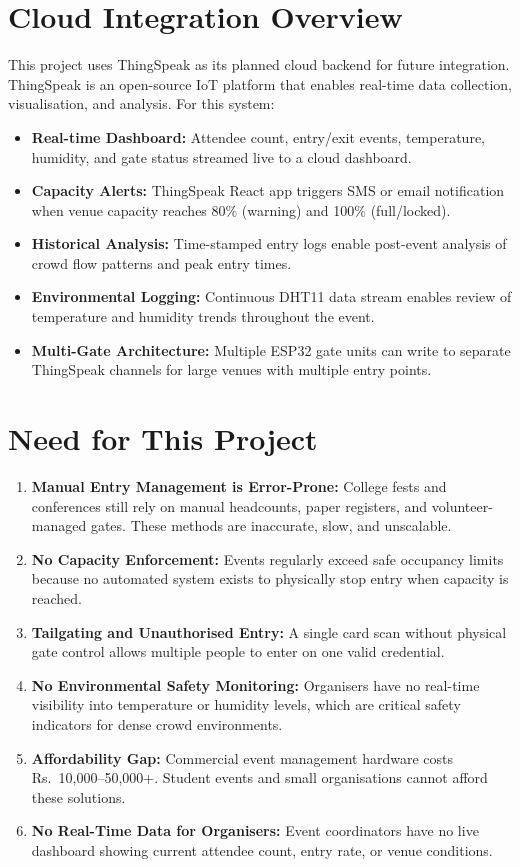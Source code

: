 \documentclass[12pt,a4paper]{report}
\begin{document}
\section{Cloud Integration Overview}

This project uses ThingSpeak as its planned cloud backend for future integration. ThingSpeak is an open-source IoT platform that enables real-time data collection, visualisation, and analysis. For this system:

\begin{itemize}[leftmargin=*]
    \item \textbf{Real-time Dashboard:} Attendee count, entry/exit events, temperature, humidity, and gate status streamed live to a cloud dashboard.
    \item \textbf{Capacity Alerts:} ThingSpeak React app triggers SMS or email notification when venue capacity reaches 80\% (warning) and 100\% (full/locked).
    \item \textbf{Historical Analysis:} Time-stamped entry logs enable post-event analysis of crowd flow patterns and peak entry times.
    \item \textbf{Environmental Logging:} Continuous DHT11 data stream enables review of temperature and humidity trends throughout the event.
    \item \textbf{Multi-Gate Architecture:} Multiple ESP32 gate units can write to separate ThingSpeak channels for large venues with multiple entry points.
\end{itemize}

\section{Need for This Project}

\begin{enumerate}[leftmargin=*]
    \item \textbf{Manual Entry Management is Error-Prone:} College fests and conferences still rely on manual headcounts, paper registers, and volunteer-managed gates. These methods are inaccurate, slow, and unscalable.
    \item \textbf{No Capacity Enforcement:} Events regularly exceed safe occupancy limits because no automated system exists to physically stop entry when capacity is reached.
    \item \textbf{Tailgating and Unauthorised Entry:} A single card scan without physical gate control allows multiple people to enter on one valid credential.
    \item \textbf{No Environmental Safety Monitoring:} Organisers have no real-time visibility into temperature or humidity levels, which are critical safety indicators for dense crowd environments.
    \item \textbf{Affordability Gap:} Commercial event management hardware costs Rs.~10,000--50,000+. Student events and small organisations cannot afford these solutions.
    \item \textbf{No Real-Time Data for Organisers:} Event coordinators have no live dashboard showing current attendee count, entry rate, or venue conditions.
\end{enumerate}
\end{document}
